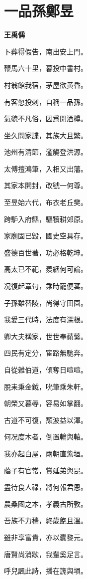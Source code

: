 \documentclass[12pt,a4paper]{ctexbook}
\begin{document}
\section{一品孫鄭昱}
\textbf{王禹偁}\par\vspace{0.5em}
卜葬得假告，南出安上門。\par
鞭馬六十里，暮投中書村。\par
村翁館我宿，茅屋欲黄昏。\par
有客忽投刺，自稱一品孫。\par
氣貌不凡俗，因爲開酒樽。\par
坐久問家諜，其族大且繁。\par
池州有清節，濫觴登洪源。\par
太傅擅鴻筆，入相又出藩。\par
其家本開封，改號一何尊。\par
至昱始六代，布衣老丘樊。\par
跨馿入府縣，驅犢耕郊原。\par
家廟固已毀，國史空具存。\par
盛德百世著，功必格乾坤。\par
高太已不祀，羨絪何可論。\par
况復起章句，乘時寵便蕃。\par
子孫雖替陵，尚得守田園。\par
我愛三代時，法度有深根。\par
卿大夫稱家，世世奉蘋蘩。\par
四民有定分，宦路無馳奔。\par
自從雜伯道，傾奪日喧喧。\par
脫耒秉金鉞，吮筆乘朱軒。\par
朝榮又暮辱，容易如掌翻。\par
古道不可復，頹波益以渾。\par
何况度木者，倒置輪與轅。\par
我亦起白屋，兩朝直紫垣。\par
蔭子有官常，賞延弟與昆。\par
盡待食人祿，將何報君恩。\par
農桑國之本，孝義古所敦。\par
吾族不力穡，終歲飽且溫。\par
雖非享富貴，亦以蠹黎元。\par
唐賢尚消歇，我輩奚足言。\par
呼兒諷此詩，播在篪與塤。\par
\end{document}
